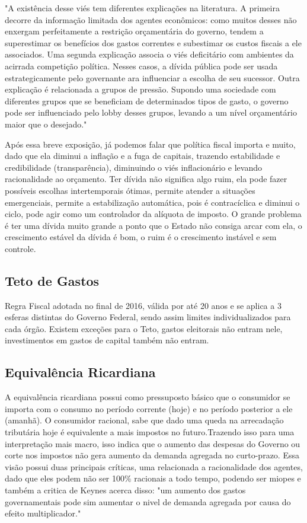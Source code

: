 \begin{citacao}
"A existência desse viés tem diferentes explicações na literatura. A primeira decorre da informação limitada dos agentes econômicos: como muitos desses não enxergam perfeitamente a restrição orçamentária do governo, tendem a superestimar os benefícios dos gastos correntes e subestimar os custos fiscais a ele associados. Uma segunda explicação associa o viés deficitário com ambientes da acirrada competição política. Nesses casos, a dívida pública pode ser usada estrategicamente pelo governante ara influenciar a escolha de seu sucessor. Outra explicação é relacionada a grupos de pressão. Supondo uma sociedade com diferentes grupos que se beneficiam de determinados tipos de gasto, o governo pode ser influenciado pelo lobby desses grupos, levando a um nível orçamentário maior que o desejado." \cite{Giambiagi}
\end{citacao}

Após essa breve exposição, já podemos falar que política fiscal importa e muito, dado que ela diminui a inflação e a fuga de capitais, trazendo estabilidade e credibilidade (transparência), diminuindo o viés inflacionário e levando racionalidade ao orçamento. 
Ter dívida não significa algo ruim, ela pode fazer possíveis escolhas intertemporais ótimas, permite atender a situações emergenciais, permite a estabilização automática, pois é contracíclica e diminui o ciclo, pode agir como um controlador da alíquota de imposto. O grande problema é ter uma dívida muito grande a ponto que o Estado não consiga arcar com ela, o crescimento estável da dívida é bom, o ruim é o crescimento instável e sem controle. 
\subsection*{Teto de Gastos}
Regra Fiscal adotada no final de 2016, válida por até 20 anos e se aplica a 3 esferas distintas do Governo Federal, sendo assim limites individualizados para cada órgão. 
Existem exceções para o Teto, gastos eleitorais não entram nele, investimentos em gastos de capital também não entram. 
\subsection*{Equivalência Ricardiana}
A equivalência ricardiana possui como pressuposto básico que o consumidor se importa com o consumo no período corrente (hoje) e no período posterior a ele (amanhã). O consumidor racional, sabe que dado uma queda na arrecadação tributária hoje é equivalente a mais impostos no futuro.Trazendo isso para uma interpretação mais macro, isso indica que o aumento das despesas do Governo ou corte nos impostos não gera aumento da demanda agregada no curto-prazo. 
Essa visão possui duas principais críticas, uma relacionada a racionalidade dos agentes, dado que eles podem não ser 100$\%$ racionais a todo tempo, podendo ser miopes e também a critica de Keynes acerca disso: "um aumento dos gastos governamentais pode sim aumentar o nivel de demanda agregada por causa do efeito multiplicador."